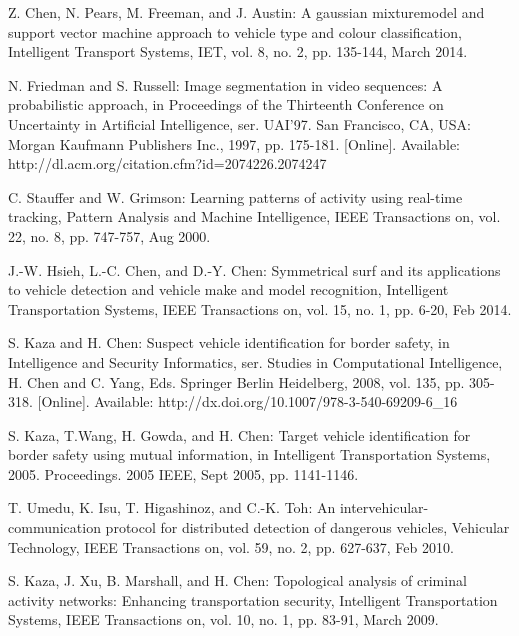 \documentclass{llncs}
\begin{document}
%
%
\begin{thebibliography}{15}
%

Z. Chen, N. Pears, M. Freeman, and J. Austin: A gaussian mixturemodel and support vector machine approach to vehicle type and colour classification, Intelligent Transport Systems, IET, vol. 8, no. 2, pp. 135-144, March 2014.

N. Friedman and S. Russell: Image segmentation in video sequences: A probabilistic approach, in Proceedings of the Thirteenth Conference on Uncertainty in Artificial Intelligence, ser. UAI'97. San Francisco, CA, USA: Morgan Kaufmann Publishers Inc., 1997, pp. 175-181. [Online]. Available: http://dl.acm.org/citation.cfm?id=2074226.2074247

C. Stauffer and W. Grimson: Learning patterns of activity using real-time tracking, Pattern Analysis and Machine Intelligence, IEEE Transactions on, vol. 22, no. 8, pp. 747-757, Aug 2000.

J.-W. Hsieh, L.-C. Chen, and D.-Y. Chen: Symmetrical surf and its applications to vehicle detection and vehicle make and model recognition, Intelligent Transportation Systems, IEEE Transactions on,
vol. 15, no. 1, pp. 6-20, Feb 2014.

S. Kaza and H. Chen: Suspect vehicle identification for border safety, in Intelligence and Security Informatics, ser. Studies in Computational Intelligence, H. Chen and C. Yang, Eds. Springer Berlin Heidelberg, 2008, vol. 135, pp. 305-318. [Online]. Available: http://dx.doi.org/10.1007/978-3-540-69209-6\_16

 S. Kaza, T.Wang, H. Gowda, and H. Chen: Target vehicle identification for border safety using mutual information, in Intelligent Transportation Systems, 2005. Proceedings. 2005 IEEE, Sept 2005, pp. 1141-1146.

T. Umedu, K. Isu, T. Higashinoz, and C.-K. Toh: An intervehicular-communication protocol for distributed detection of dangerous vehicles, Vehicular Technology, IEEE Transactions on, vol. 59, no. 2, pp. 627-637, Feb 2010.

S. Kaza, J. Xu, B. Marshall, and H. Chen: Topological analysis of criminal activity networks: Enhancing transportation security, Intelligent Transportation Systems, IEEE Transactions on, vol. 10, no. 1, pp. 83-91, March 2009.


\end{thebibliography}
\end{document}

